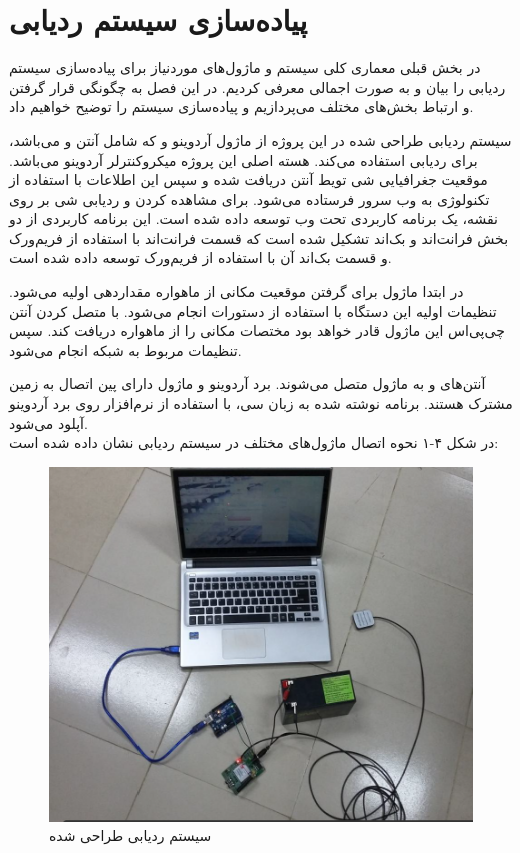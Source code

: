 \chapter{پیاده‌سازی سیستم ردیابی}
در بخش قبلی معماری کلی سیستم و ماژول‌های موردنیاز برای پیاده‌سازی سیستم ردیابی را بیان و به صورت اجمالی معرفی کردیم. در این فصل به چگونگی قرار گرفتن و ارتباط بخش‌های مختلف می‌پردازیم و پیاده‌سازی سیستم را توضیح خواهیم داد.


سیستم ردیابی طراحی شده در این پروژه از ماژول آردوینو و  که شامل آنتن  و  می‌باشد، برای ردیابی استفاده می‌کند. هسته اصلی این پروژه میکروکنترلر آردوینو می‌باشد. موقعیت جغرافیایی شی تویط آنتن  دریافت شده و سپس این اطلاعات با استفاده از تکنولوژی  به وب سرور فرستاده می‌شود. برای مشاهده کردن و ردیابی شی بر روی نقشه، یک برنامه کاربردی تحت وب توسعه داده شده است. 
این برنامه کاربردی از دو بخش فرانت‌اند و بک‌اند تشکیل شده است که قسمت فرانت‌اند با استفاده از فریم‌ورک  و قسمت بک‌اند آن با استفاده از فریم‌ورک  توسعه داده شده است.
 
 
در ابتدا ماژول  برای گرفتن موقعیت مکانی از ماهواره مقداردهی اولیه می‌شود. تنظیمات اولیه این دستگاه با استفاده از دستورات  انجام می‌شود. با متصل کردن آنتن چی‌پی‌اس این ماژول قادر خواهد بود مختصات مکانی را از ماهواره دریافت کند. سپس تنظیمات مربوط به شبکه  انجام می‌شود.


آنتن‌های  و  به ماژول  متصل می‌شوند. برد آردوینو و ماژول  دارای پین اتصال به زمین مشترک هستند. برنامه نوشته شده به زبان سی، با استفاده از نرم‌افزار  روی برد آردوینو آپلود می‌شود.
\\
\newpage
در شکل ۴-۱ نحوه اتصال ماژول‌های مختلف در سیستم ردیابی نشان داده شده است:
\begin{figure}[!h]
	\centerline{\includegraphics[width=.6\textwidth]{design-system}}
	\caption{سیستم ردیابی طراحی شده}
\end{figure}

